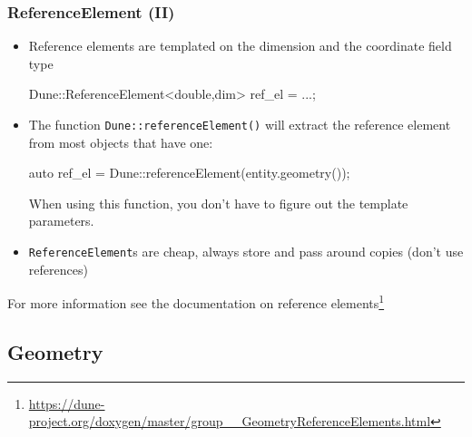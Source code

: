 \documentclass[aspectratio=169,11pt]{beamer}
\theoremstyle{definition}
\begin{document}
\begin{frame}[fragile]
  \frametitle{ReferenceElement (II)}
    \begin{itemize}
    \item Reference elements are templated on the dimension and the coordinate field type
\begin{cppcode}
Dune::ReferenceElement<double,dim> ref_el = ...;
\end{cppcode}
\item The function \lstinline!Dune::referenceElement()! will extract the reference element from most objects
  that have one:
\begin{cppcode}
auto ref_el = Dune::referenceElement(entity.geometry());
\end{cppcode}
    When using this function, you don't have to figure out the template parameters.
    \item \lstinline!ReferenceElement!s are cheap, always store and pass around copies (don't use references)
    \end{itemize}
    For more information see the documentation on reference elements\footnote{\url{https://dune-project.org/doxygen/master/group__GeometryReferenceElements.html}}
\end{frame}




\subsection{Geometry}
\end{document}
